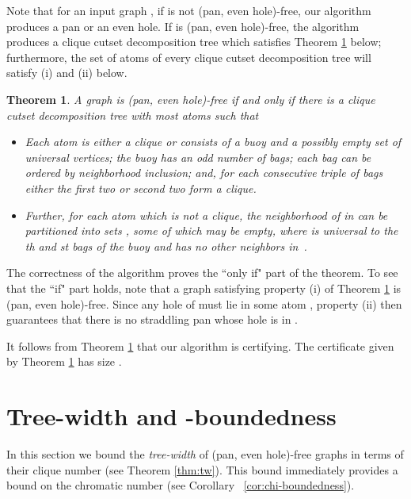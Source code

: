 \documentclass[11pt,a4paper]{article}
\newtheorem{theorem} {Theorem}[section]
\begin{document}
Note that for an input graph , if  is not (pan, even hole)-free, our algorithm produces a pan or an even hole.  If  is (pan, even hole)-free, the algorithm produces a clique cutset decomposition tree which satisfies Theorem \ref{thm:certifying} below; furthermore, the set of atoms of every clique cutset decomposition tree will satisfy (i) and (ii) below.

\begin{theorem}\label{thm:certifying}
A graph  is (pan, even hole)-free if and only if there is a clique cutset decomposition tree with most  atoms  such that
\begin{itemize}
\item[(i)] Each atom  is either a clique or consists of a buoy  and a possibly empty set  of universal vertices; the buoy  has an odd number of bags; each bag can be ordered by neighborhood inclusion; and, for each consecutive triple of bags either the first two or second two form a clique.
\item[(ii)] Further, for each atom  which is not a clique, the neighborhood of  in  can be partitioned into sets , some of which may be empty, where  is universal to the th and st bags of the buoy  and  has no other neighbors in~.
\end{itemize}
\end{theorem}

The correctness of the algorithm proves the ``only if" part of the theorem. To see that the ``if" part holds, note that a graph  satisfying property (i) of Theorem \ref{thm:certifying} is (pan, even hole)-free.  Since any hole of  must lie in some atom , property (ii) then guarantees that there is no straddling pan whose hole is in .

It follows from Theorem \ref{thm:certifying} that our algorithm is certifying.  The certificate given by Theorem \ref{thm:certifying} has size .

\section{Tree-width and -boundedness}
\label{sec:tw}

In this section we bound the \emph{tree-width} of (pan,
even hole)-free graphs in terms of their clique number (see
Theorem \ref{thm:tw}). This bound immediately provides a bound on
the chromatic number (see Corollary~ \ref{cor:chi-boundedness}).
\end{document}
